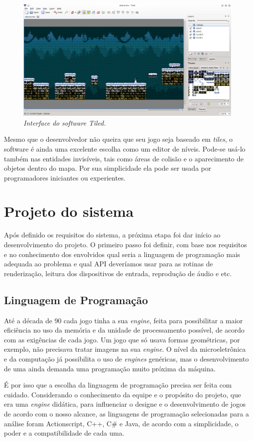 \begin{figure}[H]
    \centering
    \includegraphics[scale = 0.45]{Imagens/Tiled.png}
    \caption{\textit{Interface do \textit{software} Tiled.}}
    \label{tiled_interface}
\end{figure}
%
\par
Mesmo que o desenvolvedor não queira que seu jogo seja baseado em \textit{tiles}, o software é ainda uma excelente escolha como um editor 
de níveis. Pode-se usá-lo também nas entidades invisíveis, tais como áreas de colisão e o aparecimento de objetos dentro do 
mapa. Por sua simplicidade ela pode ser usada por programadores iniciantes ou experientes.
%
%
\section{Projeto do sistema}
%
Após definido os requisitos do sistema, a próxima etapa foi dar início ao desenvolvimento do projeto. O primeiro passo foi definir, com base nos requisitos e no conhecimento dos envolvidos qual seria a linguagem de programação mais adequada ao problema e qual API deveríamos usar para as rotinas de renderização, leitura dos dispositivos de entrada, reprodução de áudio e etc.
%
%
\subsection{Linguagem de Programação}
\label{linguagem}
%
Até a década de 90 cada jogo tinha a sua \textit{engine}, feita para possibilitar a maior eficiência no uso da memória e da unidade de 
processamento possível, de acordo com as exigências de cada jogo. Um jogo que só usava formas geométricas, por exemplo, não precisava 
tratar imagens na sua \textit{engine}. O nível da microeletrônica e da computação já possibilita o uso de \textit{engines} genéricas, 
mas o desenvolvimento de uma ainda demanda uma programação muito próxima da máquina. 
\par
É por isso que a escolha da linguagem de programação precisa ser feita com cuidado. Considerando o conhecimento da equipe e o propósito do 
projeto, que era uma \textit{engine} didática, para influenciar o designe e o desenvolvimento de jogos de acordo com o nosso alcance, as linguagens de programação selecionadas para a análise foram Actionscript, C++, C\# e Java, de acordo com a simplicidade, o poder e a compatibilidade de cada uma.
%
